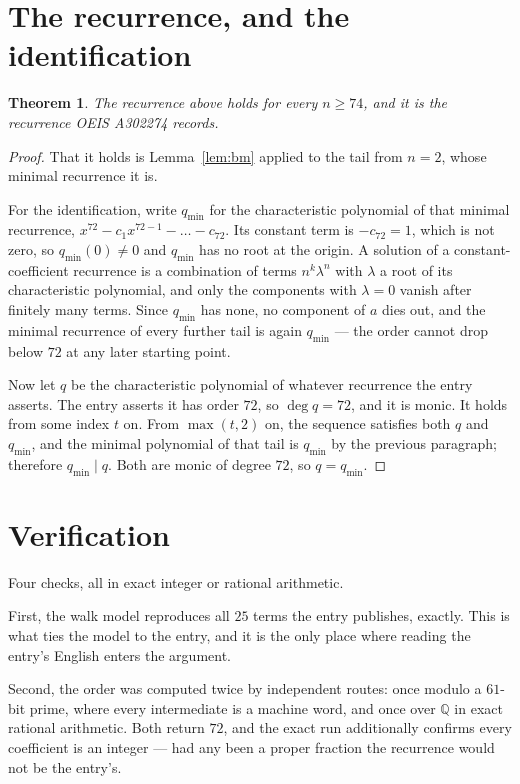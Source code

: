 \documentclass[11pt,a4paper]{article}
\theoremstyle{plain}
\newtheorem{theorem}{Theorem}
\theoremstyle{definition}
\begin{document}
\section{The recurrence, and the identification}

\begin{theorem}
The recurrence above holds for every $n\ge74$, and it is the recurrence OEIS A302274 records.
\end{theorem}

\begin{proof}
That it holds is Lemma~\ref{lem:bm} applied to the tail from $n=2$, whose minimal
recurrence it is.

For the identification, write $q_{\min}$ for the characteristic polynomial of that minimal
recurrence, $x^{72}-c_1x^{72-1}-\dots-c_{72}$. Its constant term is
$-c_{72}=1$, which is not zero, so $q_{\min}(0)\neq0$ and $q_{\min}$ has no
root at the origin. A solution of a constant-coefficient recurrence is a combination of terms
$n^{k}\lambda^{n}$ with $\lambda$ a root of its characteristic polynomial, and only the
components with $\lambda=0$ vanish after finitely many terms. Since $q_{\min}$ has none, no
component of $a$ dies out, and the minimal recurrence of every further tail is again
$q_{\min}$ --- the order cannot drop below $72$ at any later starting point.

Now let $q$ be the characteristic polynomial of whatever recurrence the entry asserts. The
entry asserts it has order $72$, so $\deg q=72$, and it is monic. It holds from some
index $t$ on. From $\max(t,2)$ on, the sequence satisfies both $q$ and $q_{\min}$, and
the minimal polynomial of that tail is $q_{\min}$ by the previous paragraph; therefore
$q_{\min}\mid q$. Both are monic of degree $72$, so $q=q_{\min}$.
\end{proof}

\section{Verification}

Four checks, all in exact integer or rational arithmetic.

First, the walk model reproduces all $25$ terms the entry publishes, exactly. This is
what ties the model to the entry, and it is the only place where reading the entry's English
enters the argument.

Second, the order was computed twice by independent routes: once modulo a $61$-bit prime, where
every intermediate is a machine word, and once over $\mathbb{Q}$ in exact rational arithmetic.
Both return $72$, and the exact run additionally confirms every coefficient is an integer
--- had any been a proper fraction the recurrence would not be the entry's.
\end{document}
